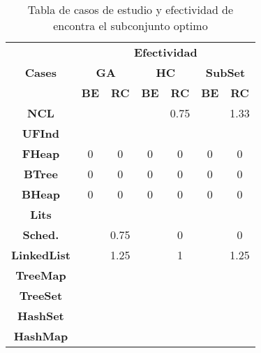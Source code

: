 \begin{table}[t]
\centering
\label{tab:t1}
\scriptsize
\begin{tabular}{|c c|cc|cc|cc|}
\midrule
\multicolumn{2}{|c|}{\multirow{3}{*}{\textbf{Cases}}} & \multicolumn{6}{c|}{\textbf{Efectividad}} \\
\cline{3-8}
\multicolumn{2}{|c|}{} & \multicolumn{2}{c}{\textbf{GA}} & \multicolumn{2}{c}{\textbf{HC}} & \multicolumn{2}{c|}{\textbf{SubSet}} \\
\multicolumn{2}{|c|}{} & \textbf{\tiny{BE}} & \textbf{\tiny{RC}} & \textbf{\tiny{BE}} & \textbf{\tiny{RC}} & \textbf{\tiny{BE}} & \textbf{\tiny{RC}} \\
\midrule
\multicolumn{2}{|c|}{\textbf{NCL}} &   &   &  &  0.75 & &  1.33 \\
\midrule
\multicolumn{2}{|c|}{\textbf{UFInd}}&   &   &   &   &   &      \\
\midrule

\multicolumn{2}{|c|}{\textbf{FHeap}}& 0 & 0  &  0 &  0 &  0 &  0   \\
\midrule

\multicolumn{2}{|c|}{\textbf{BTree}} & 0 & 0  &  0 &  0 &  0 &  0  \\
\midrule

\multicolumn{2}{|c|}{\textbf{BHeap}}& 0 & 0  &  0 &  0 &  0 &  0   \\
\midrule

\multicolumn{2}{|c|}{\textbf{Lits}} &   &   &   &   &   &    \\
\midrule

\multicolumn{2}{|c|}{\textbf{Sched.}} &   & 0.75   &   &  0 &   & 0   \\

\midrule
\multicolumn{2}{|c|}{\textbf{LinkedList}} &  &  1.25 &   &  1 &  &  1.25  \\
\midrule

\multicolumn{2}{|c|}{\textbf{TreeMap}} &   &   &   &   &   &     \\
\midrule

\multicolumn{2}{|c|}{\textbf{TreeSet}} &   &   &   &   &   &    \\
\midrule

\multicolumn{2}{|c|}{\textbf{HashSet}} &   &   &   &   &   &    \\
\midrule

\multicolumn{2}{|c|}{\textbf{HashMap}} &   &   &   &   &   &    \\
\hline
\end{tabular}

\caption{Tabla de casos de estudio y efectividad de encontra el subconjunto optimo}
\label{tab:efectividad}
\end{table}

